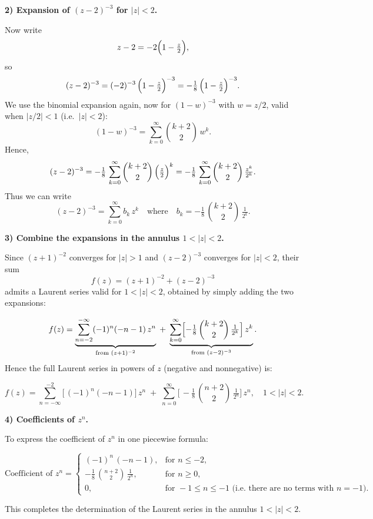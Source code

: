 \documentclass[12pt]{article}
\theoremstyle{definition} %
\theoremstyle{plain} %
\begin{document}
\medskip

\noindent
\textbf{2) Expansion of $(z-2)^{-3}$ for $|z| < 2$.}

Now write
\[
z-2 = -2\Bigl(1 - \tfrac{z}{2}\Bigr),
\]
so
\[
(z-2)^{-3}
= (-2)^{-3}\,\Bigl(1 - \tfrac{z}{2}\Bigr)^{-3}
= -\tfrac{1}{8}\,\Bigl(1 - \tfrac{z}{2}\Bigr)^{-3}.
\]
We use the binomial expansion again, now for $(1 - w)^{-3}$ with $w = z/2$, valid when $|z/2|<1$ (i.e.\ $|z|<2$):
\[
(1 - w)^{-3}
= \sum_{k=0}^{\infty} \binom{k+2}{2}\, w^k.
\]
Hence,
\[
(z-2)^{-3}
= -\tfrac{1}{8}\,
\sum_{k=0}^{\infty} \binom{k+2}{2}\,\Bigl(\tfrac{z}{2}\Bigr)^k
= -\tfrac{1}{8}\,
\sum_{k=0}^{\infty} \binom{k+2}{2}\,\tfrac{z^k}{2^k}.
\]
Thus we can write
\[
(z-2)^{-3}
= \sum_{k=0}^{\infty} b_k\,z^k
\quad\text{where}\quad
b_k 
= -\tfrac{1}{8}\,\binom{k+2}{2}\,\tfrac{1}{2^k}.
\]

\medskip

\noindent
\textbf{3) Combine the expansions in the annulus $1<|z|<2$.}

Since $(z+1)^{-2}$ converges for $|z|>1$ and $(z-2)^{-3}$ converges for $|z|<2$, their sum
\[
f(z) = (z+1)^{-2} + (z-2)^{-3}
\]
admits a Laurent series valid for $1<|z|<2$, obtained by simply adding the two expansions:

\[
f(z)
= \underbrace{\sum_{n=-2}^{-\infty} (-1)^n(-n-1)\,z^n}_{\text{from }(z+1)^{-2}}
\;+\;
\underbrace{\sum_{k=0}^{\infty} \Bigl[-\tfrac{1}{8}\,\binom{k+2}{2}\,\tfrac{1}{2^k}\Bigr]\,z^k}_{\text{from }(z-2)^{-3}}.
\]
Hence the full Laurent series in powers of $z$ (negative and nonnegative) is:

\[
\boxed{
f(z) 
= \sum_{n=-\infty}^{-2} \bigl[\,(-1)^n(-n-1)\bigr]\,z^n
\;+\;
\sum_{n=0}^{\infty} \bigl[\,-\tfrac{1}{8}\,\binom{n+2}{2}\,\tfrac{1}{2^n}\bigr]\,z^n,
\quad
1 < |z| < 2.
}
\]

\medskip

\noindent
\textbf{4) Coefficients of $z^n$.}

To express the coefficient of $z^n$ in one piecewise formula:

\[
\text{Coefficient of } z^n 
= 
\begin{cases}
(-1)^n \,(-n-1), 
& \text{for } n \le -2, \\[6pt]
-\tfrac{1}{8}\,\displaystyle\binom{n+2}{2}\,\tfrac{1}{2^n}, 
& \text{for } n \ge 0, \\[6pt]
0,
& \text{for } -1 \le n \le -1 
\text{ (i.e.\ there are no terms with } n=-1 \text{).}
\end{cases}
\]

This completes the determination of the Laurent series in the annulus $1 < |z| < 2$.
\end{document}
